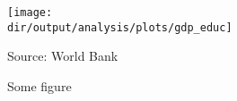 \begin{figure}
\caption{Some figure\label{fig:gdp_educ}}

\begin{centering}
\medskip{}
\par\end{centering}
\begin{centering}
\texttt{[image: \\dir/output/analysis/plots/gdp\_educ]}\medskip{}
\par\end{centering}
{\footnotesize{}Source: World Bank}{\footnotesize\par}
\end{figure}

